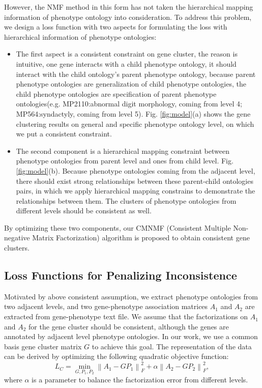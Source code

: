 \documentclass{bmcart}
\begin{document}
However, the NMF method in this form has not taken the hierarchical mapping information of phenotype ontology into consideration. To address this problem, we design a loss function with two aspects for formulating the loss with hierarchical information of phenotype ontologies:
\begin{itemize}
\item The first aspect is a consistent constraint on gene cluster, the reason is intuitive, one gene interacts with a child phenotype ontology, it should interact with the child ontology's parent phenotype ontology, because parent phenotype ontologies are generalization of child phenotype ontologies, the child phenotype ontologies are specification of parent phenotype ontologies(e.g. MP2110:abnormal digit morphology, coming from level 4; MP564:syndactyly, coming from level 5). Fig. \ref{fig:model}(a) shows the gene clustering results on general and specific phenotype ontology level, on which we put a consistent constraint.
\item The second component is a hierarchical mapping constraint between phenotype ontologies from parent level and ones from child level. Fig. \ref{fig:model}(b). Because phenotype ontologies coming from the adjacent level, there should exist strong relationships between these parent-child ontologies pairs, in which we apply hierarchical mapping constrains to demonstrate the relationships between them. The clusters of phenotype ontologies from different levels should be consistent as well.
\end{itemize}
By optimizing these two components, our CMNMF (Consistent Multiple Non-negative Matrix Factorization) algorithm is proposed to obtain consistent gene clusters.

\subsection*{\textbf{Loss Functions for Penalizing Inconsistence}}
Motivated by above consistent assumption, we extract phenotype ontologies from two adjacent levels, and two gene-phenotype association matrices $A_{1}$ and $A_{2}$ are extracted from gene-phenotype text file. We assume that the factorizations on  $A_{1}$ and $A_{2}$ for the gene cluster should be consistent, although the genes are annotated by adjacent level phenotype ontologies. In our work, we use a common basis gene cluster matrix $G$ to achieve this goal. The representation of the data can be derived by optimizing the following quadratic objective function:
\begin{equation}
{L_C} = \mathop {\min }\limits_{G,{P_1},{P_2}} \left\| {{A_1} - G{P_1}} \right\|_F^2 + \alpha \left\| {{A_2} - G{P_2}} \right\|_F^2,
\end{equation}
where $\alpha$ is a parameter to balance the factorization error from different levels.
\end{document}
